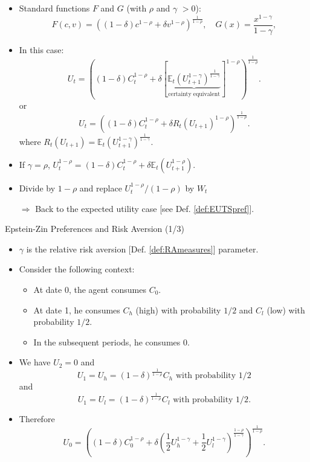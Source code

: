 \begin{frame}{}
\begin{footnotesize}
\begin{itemize}
	\item Standard functions $F$ and $G$ (with $\rho$ and $\gamma$ $>0$):
	$$
	F(c,v) = \left((1-\delta)c^{1-\rho} + \delta v^{1-\rho}\right)^{\frac{1}{1-\rho}}, \quad G(x)=\frac{x^{1-\gamma}}{1-\gamma},
	$$
	\item In this case:
	\begin{equation}\label{eq:EZpreferences}
	\boxed{	U_t = \left((1-\delta)C_t^{1-\rho}+\delta \left[\underbrace{ \mathbb{E}_t\left(U_{t+1}^{1-\gamma}\right)^{\frac{1}{1-\gamma}} }_{\mbox{certainty equivalent}}\right] ^{1-\rho}\right)^{\frac{1}{1-\rho}}.}
	\end{equation}
	or
	$$
	U_t = \left((1-\delta)C_t^{1-\rho} + \delta R_t(U_{t+1})^{1-\rho}\right)^{\frac{1}{1-\rho}}.
	$$
	where $R_t(U_{t+1})=\mathbb{E}_t(U_{t+1}^{1-\gamma})^{\frac{1}{1-\gamma}}$.
\end{itemize}
\begin{remark}[Case $\gamma = \rho$]
\begin{itemize}
	\item If $\gamma = \rho$, $U_t^{1-\rho}=(1-\delta)C_t^{1-\rho} + \delta \mathbb{E}_t(U_{t+1}^{1-\rho})$.
	\item Divide by $1-\rho$ and replace $U_t^{1-\rho}/(1-\rho)$ by $W_t$
	\item[$\Rightarrow$] Back to the expected utility case [see Def. \ref{def:EUTSpref}].
\end{itemize}
\end{remark}
\end{footnotesize}
\end{frame}

\begin{frame}{Epstein-Zin Preferences and Risk Aversion (1/3)}
\begin{footnotesize}
\begin{itemize}
	\item $\gamma$ is the {\color{blue}relative risk aversion} [Def. \ref{def:RAmeasures}] parameter.
	\item Consider the following context:
	\begin{itemize}
		\item At date 0, the agent consumes $C_0$.
		\item At date 1, he consumes $C_h$ (high) with probability $1/2$ and $C_l$ (low) with probability $1/2$.
		\item In the subsequent periods, he consumes 0.
	\end{itemize}
	\item We have $U_2 = 0$ and
	$$
	U_1 = U_h = (1-\delta)^{\frac{1}{1-\rho}}C_h \mbox{ with probability 1/2}
	$$
	and
	$$
	U_1 = U_l = (1-\delta)^{\frac{1}{1-\rho}}C_l \mbox{ with probability 1/2}.
	$$
	\item Therefore
	$$
	U_0 =  \left((1-\delta)C_0^{1-\rho} + \delta \left(\frac{1}{2}U_h^{1-\gamma}+\frac{1}{2}U_l^{1-\gamma}\right)^{\frac{1-\rho}{1-\gamma}}\right)^{\frac{1}{1-\rho}}.
	$$
\end{itemize}
\end{footnotesize}
\end{frame}


